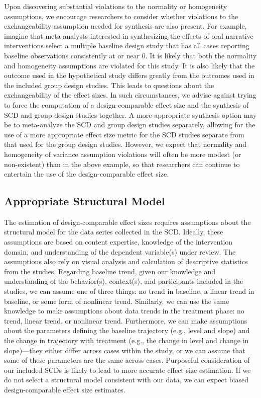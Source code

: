 \documentclass[
]{book}
\begin{document}
Upon discovering substantial violations to the normality or homogeneity assumptions, we encourage researchers to consider whether violations to the exchangeability assumption needed for synthesis are also present. For example, imagine that meta-analysts interested in synthesizing the effects of oral narrative interventions select a multiple baseline design study that has all cases reporting baseline observations consistently at or near 0. It is likely that both the normality and homogeneity assumptions are violated for this study. It is also likely that the outcome used in the hypothetical study differs greatly from the outcomes used in the included group design studies. This leads to questions about the exchangeability of the effect sizes. In such circumstances, we advise against trying to force the computation of a design-comparable effect size and the synthesis of SCD and group design studies together. A more appropriate synthesis option may be to meta-analyze the SCD and group design studies separately, allowing for the use of a more appropriate effect size metric for the SCD studies separate from that used for the group design studies. However, we expect that normality and homogeneity of variance assumption violations will often be more modest (or non-existent) than in the above example, so that researchers can continue to entertain the use of the design-comparable effect size.

\hypertarget{appropriate-structural-model}{%
\subsection{Appropriate Structural Model}\label{appropriate-structural-model}}

The estimation of design-comparable effect sizes requires assumptions about the structural model for the data series collected in the SCD. Ideally, these assumptions are based on content expertise, knowledge of the intervention domain, and understanding of the dependent variable(s) under review. The assumptions also rely on visual analysis and calculation of descriptive statistics from the studies. Regarding baseline trend, given our knowledge and understanding of the behavior(s), context(s), and participants included in the studies, we can assume one of three things: no trend in baseline, a linear trend in baseline, or some form of nonlinear trend. Similarly, we can use the same knowledge to make assumptions about data trends in the treatment phase: no trend, linear trend, or nonlinear trend. Furthermore, we can make assumptions about the parameters defining the baseline trajectory (e.g., level and slope) and the change in trajectory with treatment (e.g., the change in level and change in slope)---they either differ across cases within the study, or we can assume that some of these parameters are the same across cases. Purposeful consideration of our included SCDs is likely to lead to more accurate effect size estimation. If we do not select a structural model consistent with our data, we can expect biased design-comparable effect size estimates.
\end{document}

